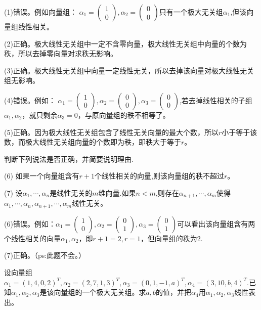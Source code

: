 \documentclass[a4paper]{report}
\begin{document}
\begin{jie}
(1)错误。例如向量组：
$\alpha_1=
\begin{pmatrix}
1\\ 0
\end{pmatrix},\alpha_2=
\begin{pmatrix}
0\\ 0
\end{pmatrix}
$只有一个极大无关组$\alpha_1$,但该向量组线性相关。

(2)正确。极大线性无关组中一定不含零向量，极大线性无关组中向量的个数为秩，所以去掉零向量对求秩无影响。

(3)正确。极大线性无关组中向量一定线性无关，所以去掉该向量对极大线性无关组无影响。

(4)错误。例如：
$\alpha_1=
\begin{pmatrix}
1\\ 0
\end{pmatrix},\alpha_2=
\begin{pmatrix}
0\\ 0
\end{pmatrix},\alpha_3=
\begin{pmatrix}
0\\ 0
\end{pmatrix}
$,若去掉线性相关的子组$\alpha_1,\alpha_2$，就只剩余$\alpha_3=0$，与原向量组的秩不相等了。

(5)正确。因为极大线性无关组包含了线性无关向量的最大个数，所以$r$小于等于该数，而极大线性无关组向量的个数即为秩，即秩大于等于$r$。
\end{jie}

\EX 判断下列说法是否正确，并简要说明理由.

(6) 如果一个向量组含有$r+1$个线性相关的向量,则该向量组的秩不超过$r$。

(7) 设$\alpha_1,\cdots,\alpha_n$是线性无关的$m$维向量.如果$n< m$,则存在$\alpha_{n+1},\cdots,\alpha_{m}$使得\\
$\alpha_1,\cdots,\alpha_n,\alpha_ {n+1},\cdots,\alpha_{m}$线性无关。

\begin{jie}
(6)错误。例如：$\alpha_1=
\begin{pmatrix}
1\\ 0
\end{pmatrix},\alpha_2=
\begin{pmatrix}
0\\ 1
\end{pmatrix},\alpha_3=
\begin{pmatrix}
0\\ 1
\end{pmatrix}
$可以看出该向量组含有两个线性相关的向量$\alpha_1,\alpha_2$，即$r+1=2,r=1$，但向量组的秩为2.

(7)正确。（\textcolor[rgb]{0.50,1.00,0.00}{ps:此题不会。}）
\end{jie}
\EX 设向量组$\alpha_1=(1,4,0,2)^T,\alpha_2=(2,7,1,3)^T,\alpha_3=(0,1,-1,a)^T,\alpha_4=(3,10,b,4)^T$.已知$\alpha_1,\alpha_2,\alpha_3$是该向量组的一个极大无关组。求$a,b$的值，并把$\alpha_4$用$\alpha_1,\alpha_2,\alpha_3$线性表出。
\end{document}
